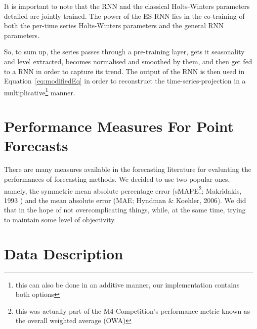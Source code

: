 \documentclass[conference]{IEEEtran}
\begin{document}
It is important to note that the RNN and the classical Holts-Winters parameters detailed are jointly trained. The power of the ES-RNN\cite{es-rnn} lies in the co-training of both the per-time series Holts-Winters parameters and the general RNN parameters.

So, to sum up, the series passes through a pre-training layer, gets it seasonality and level extracted, becomes normalised and smoothed by them, and then get fed to a RNN in order to capture its trend. The output of the RNN is then used in Equation~\ref{eq:modifiedEq} in order to reconstruct the time-series-projection in a multiplicative\footnote{this can also be done in an additive manner, our implementation contains both options} manner.

\section{Performance Measures For Point Forecasts}

There are many measures available in the forecasting literature for evaluating the performances of forecasting methods\cite{mase}. We decided to use two popular ones, namely, the symmetric mean absolute percentage error (sMAPE\footnote{this was actually part of the M4-Competition's performance metric known as the overall weighted average (OWA)}; Makridakis, 1993 \cite{smape}) and the mean absolute error (MAE; Hyndman \& Koehler, 2006\cite{mase}). We did that in the hope of not overcomplicating things, while, at the same time, trying to maintain some level of objectivity.

\section{Data Description}
\end{document}
